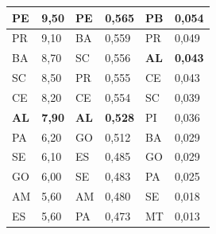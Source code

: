 \begin{table}[H]
\begin{tabular}{|l|l|l|l|l|l|}
		PE                          & 9,50                          & PE                     & 0,565                                    & PB                                  & 0,054                                  \\ \hline
		PR                          & 9,10                          & BA                     & 0,559                                    & PR                                  & 0,049                                  \\ \hline
		BA                          & 8,70                          & SC                     & 0,556            & \textbf{AL} & \textbf{0,043} \\ \hline
		SC                          & 8,50                          & PR                     & 0,555                                    & CE                                  & 0,043                                  \\ \hline
		CE                          & 8,20                          & CE                     & 0,554                                    & SC                                  & 0,039                                  \\ \hline
		\textbf{AL}                 & \textbf{7,90}                 & \textbf{AL}            & \textbf{0,528}                           & PI                                  & 0,036                                  \\ \hline
		PA                          & 6,20                          & GO                     & 0,512                                    & BA                                  & 0,029                                  \\ \hline
		SE                          & 6,10                          & ES                     & 0,485                                    & GO                                  & 0,029                                  \\ \hline
		GO                          & 6,00                          & SE                     & 0,483                                    & PA                                  & 0,025                                  \\ \hline
		AM                          & 5,60                          & AM                     & 0,480                                    & SE                                  & 0,018                                  \\ \hline
		ES                          & 5,60                          & PA                     & 0,473                                    & MT                                  & 0,013                                  \\ \hline

\end{tabular}
\end{table}
